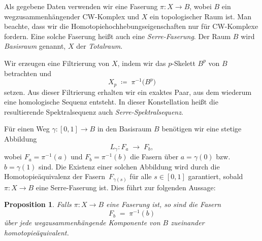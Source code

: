 \documentclass[12pt, hidelinks]{article}
\numberwithin{conj}{section}
\newtheorem{proposition}[conj]{Proposition}
\begin{document}
        Als gegebene Daten verwenden wir eine Faserung \(\pi : X \to B\), wobei \(B\) ein wegzusammenhängender CW-Komplex und \(X\) ein topologischer Raum ist. Man beachte, dass wir die Homotopiehochhebungseigenschaften nur für CW-Komplexe fordern. Eine solche Faserung heißt auch eine \emph{Serre-Faserung}. Der Raum \(B\) wird \emph{Basisraum} genannt, \(X\) der \emph{Totalraum}. 
        
        Wir erzeugen eine Filtrierung von \(X\), indem wir das \(p\)-Skelett \(B^p\) von \(B\) betrachten und
        \[
            X_p \;\coloneqq\; \pi^{-1}\bigl(B^p\bigr)
        \]
        setzen. Aus dieser Filtrierung erhalten wir ein exaktes Paar, aus dem wiederum eine homologische Sequenz entsteht. In dieser Konstellation heißt die resultierende Spektralsequenz auch \emph{Serre-Spektralsequenz}.
        
        \smallskip
        
        Für einen Weg \(\gamma: [0,1] \to B\) in den Basisraum \(B\) benötigen wir eine stetige Abbildung
        \[
            L_\gamma : F_a \;\longrightarrow\; F_b,
        \]
        wobei \(F_a = \pi^{-1}(a)\) und \(F_b = \pi^{-1}(b)\) die Fasern über \(a = \gamma(0)\) bzw.\ \(b = \gamma(1)\) sind. Die Existenz einer solchen Abbildung wird durch die Homotopieäquivalenz der Fasern \(\,F_{\gamma(s)}\) für alle \(s\in[0,1]\) garantiert, sobald \(\pi : X \to B\) eine Serre-Faserung ist. Dies führt zur folgenden Aussage:
        
        \begin{proposition}
            Falls \(\pi : X \to B\) eine Faserung ist, so sind die Fasern 
            \[
                F_b \;=\; \pi^{-1}(b)
            \]
            über jede wegzusammenhängende Komponente von \(B\) zueinander homotopieäquivalent.
        \end{proposition}
        
\end{document}
